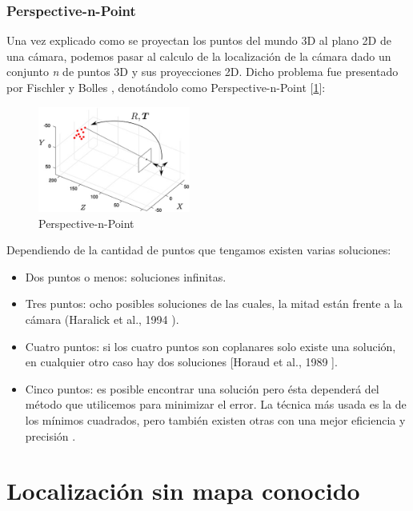 \documentclass{bmvc2k}
\begin{document}
\subsubsection{Perspective-n-Point}
Una vez explicado como se proyectan los puntos del mundo 3D al plano 2D de una cámara, 
podemos pasar al calculo de la localización de la cámara dado un conjunto \textit{n} de puntos 3D y sus proyecciones 2D. Dicho problema fue presentado por Fischler y Bolles \cite{Fischler}, denotándolo como Perspective-n-Point [\ref{fig:PnP}]:

\begin{figure}[H]
	\centering\includegraphics[width=5cm]{images/perspective_n_point.jpg}
	\caption{Perspective-n-Point}
	\label{fig:PnP}
\end{figure}

Dependiendo de la cantidad de puntos que tengamos existen varias soluciones:

\begin{itemize}
	\item Dos puntos o menos: soluciones infinitas.
	\item Tres puntos: ocho posibles soluciones de las cuales, la mitad están frente a la cámara (Haralick et 	al., 1994 \cite{trespuntos}).
	\item Cuatro puntos: si los cuatro puntos son coplanares solo existe una solución, en cualquier otro caso hay dos soluciones [Horaud et al., 1989 \cite{cuatropuntos}].
	\item Cinco puntos: es posible encontrar una solución pero ésta dependerá del método que utilicemos para minimizar el error. La técnica más usada es la de los mínimos cuadrados, pero también existen otras con una mejor eficiencia y precisión \cite{cincopuntos}.
\end{itemize}





\section{Localización sin mapa conocido}
\end{document}
